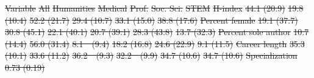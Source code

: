 \documentclass[
  10pt,
  letterpaper,
]{article}
\providecommand{\DIFdeltex}[1]{{\protect\color{red}\sout{#1}}}                      %
\providecommand{\DIFdelbegin}{} %
\providecommand{\DIFdelend}{} %
\providecommand{\DIFdelFL}[1]{\DIFdel{#1}} %
\providecommand{\DIFdelbeginFL}{} %
\providecommand{\DIFdel}[1]{\texorpdfstring{\DIFdeltex{#1}}{}} %
\newcommand{\DIFscaledelfig}{0.5}
\newlength{\DIFdelgraphicswidth} %
\newlength{\DIFdelgraphicsheight} %
\newcommand{\DIFdelincludegraphics}[2][]{%
\sbox{\DIFdelgraphicsbox}{\DIFOincludegraphics[#1]{#2}}%
\settoboxwidth{\DIFdelgraphicswidth}{\DIFdelgraphicsbox} %
\settoboxtotalheight{\DIFdelgraphicsheight}{\DIFdelgraphicsbox} %
\scalebox{\DIFscaledelfig}{%
\parbox[b]{\DIFdelgraphicswidth}{\usebox{\DIFdelgraphicsbox}\\[-\baselineskip] \rule{\DIFdelgraphicswidth}{0em}}\llap{\resizebox{\DIFdelgraphicswidth}{\DIFdelgraphicsheight}{%
\setlength{\unitlength}{\DIFdelgraphicswidth}%
\begin{picture}(1,1)%
\thicklines\linethickness{2pt} %
{\color[rgb]{1,0,0}\put(0,0){\framebox(1,1){}}}%
{\color[rgb]{1,0,0}\put(0,0){\line( 1,1){1}}}%
{\color[rgb]{1,0,0}\put(0,1){\line(1,-1){1}}}%
\end{picture}%
}\hspace*{3pt}}} %
} %
\DeclareRobustCommand{\DIFdelbegin}{\DIFOdelbegin \let\includegraphics\DIFdelincludegraphics} %
\DeclareRobustCommand{\DIFdelend}{\DIFOaddend \let\includegraphics\DIFOincludegraphics} %
\DeclareRobustCommand{\DIFdelbeginFL}{\DIFOdelbeginFL \let\includegraphics\DIFdelincludegraphics} %
\begin{document}
\DIFdelbegin %
\DIFdelend \begin{table}
\begin{adjustwidth}{-1.5in}{0in} %
\caption{\label{tbl-desc}Mean and standard deviation on key variables
for the whole sample and by field, based on first complete dataset}
\DIFdelbeginFL %
\DIFdelFL{Variable }%
\DIFdelFL{All }%
\DIFdelFL{Humanities }%
\DIFdelFL{Medical }%
\DIFdelFL{Prof. }%
\DIFdelFL{Soc. Sci. }%
\DIFdelFL{STEM }%
\DIFdelFL{H-index }%
\DIFdelFL{44.1 (20.9) }%
\DIFdelFL{19.8 (10.4) }%
\DIFdelFL{52.2 (21.7) }%
\DIFdelFL{29.4 (10.7) }%
\DIFdelFL{33.1 (15.0) }%
\DIFdelFL{38.8 (17.6) }%
\DIFdelFL{Percent female }%
\DIFdelFL{19.1 (37.7) }%
\DIFdelFL{30.8 (45.1) }%
\DIFdelFL{22.1 (40.1) }%
\DIFdelFL{20.7 (39.1) }%
\DIFdelFL{28.3 (43.8) }%
\DIFdelFL{13.7 (32.3) }%
\DIFdelFL{Percent sole author }%
\DIFdelFL{10.7 (14.4) }%
\DIFdelFL{56.0 (31.4) }%
\DIFdelFL{8.1~~(9.4) }%
\DIFdelFL{18.2 (16.8) }%
\DIFdelFL{24.6 (22.9) }%
\DIFdelFL{9.1 (11.5) }%
\DIFdelFL{Career length }%
\DIFdelFL{35.3 (10.1) }%
\DIFdelFL{33.6 (11.2) }%
\DIFdelFL{36.2~~(9.3) }%
\DIFdelFL{32.2~~(9.9) }%
\DIFdelFL{34.7 (10.6) }%
\DIFdelFL{34.7 (10.6) }%
\DIFdelFL{Specialization }%
\DIFdelFL{0.73 (0.19) }%

\end{adjustwidth}
\end{table}
\end{document}
